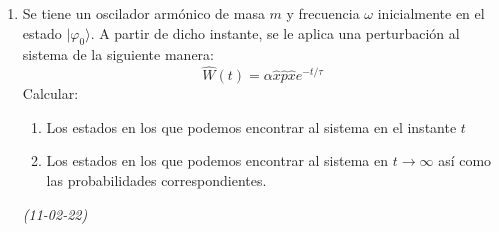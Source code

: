 \begin{enumerate}
    \item Se tiene un oscilador armónico de masa \(m\) y frecuencia \(\omega\) inicialmente en el estado \(|\varphi_0\rangle\). A partir de dicho instante, se le aplica una perturbación al sistema de la siguiente manera:
    \[
    \hat{W}(t) = \alpha \hat{x} \hat{p} \hat{x} e^{-t/\tau}
    \]
    Calcular: 
    \begin{enumerate}
        \item Los estados en los que podemos encontrar al sistema en el instante \(t\)
        \item Los estados en los que podemos encontrar al sistema en \(t \to \infty\) así como las probabilidades correspondientes.
    \end{enumerate} \textit{(11-02-22)}

    
    

\end{enumerate}